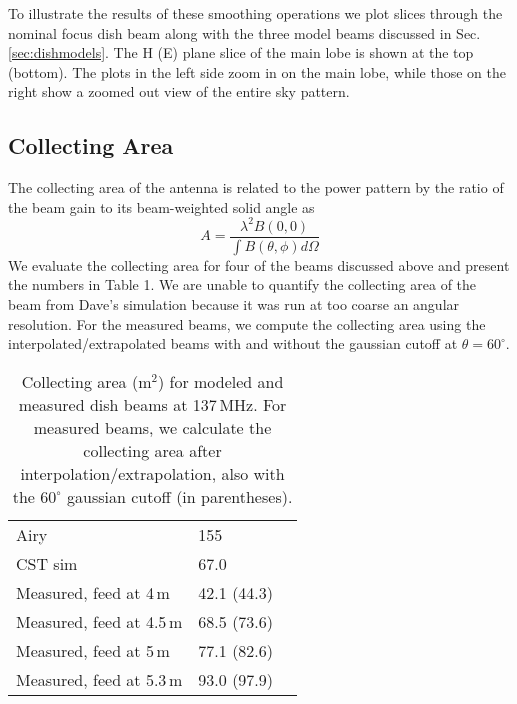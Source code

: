 \documentclass{emulateapj}
\begin{document}

To illustrate the results of these smoothing operations we plot slices through the nominal focus dish beam along with the three model beams discussed in Sec. \ref{sec:dishmodels}. The H (E) plane slice of the main lobe is shown at the top (bottom). The plots in the left side zoom in on the main lobe, while those on the right show a zoomed out view of the entire sky pattern. 

\subsection{Collecting Area}

The collecting area of the antenna is related to the power pattern by the ratio of the beam gain to its beam-weighted solid angle as
\begin{equation}
	A=\frac{\lambda^2 B(0,0)}{\int B(\theta,\phi)d\Omega}
\end{equation}
We evaluate the collecting area for four of the beams discussed above and present the numbers in Table 1. We are unable to quantify the collecting area of the beam from Dave's simulation because it was run at too coarse an angular resolution. For the measured beams, we compute the collecting area using the interpolated/extrapolated beams with and without the gaussian cutoff at $\theta=60^\circ$.

 \begin{table}[h]
 \caption{ \label{table:collectingareatable}Collecting area (m$^2$) for modeled and measured dish beams at 137\,MHz. For measured beams, we calculate the collecting area after interpolation/extrapolation, also with the $60^\circ$ gaussian cutoff (in parentheses).}
\begin{tabular}{| l | l | l |}
\hline
  Airy & 155\,  \\
  CST sim & 67.0\,  \\
  \hline
  Measured, feed at 4\,m & 42.1 (44.3) \\
  Measured, feed at 4.5\,m & 68.5 (73.6) \\ 
  Measured, feed at 5\,m & 77.1 (82.6) \\
  Measured, feed at 5.3\,m & 93.0 (97.9)\\
  \hline
\end{tabular}
\end{table}
\end{document}
